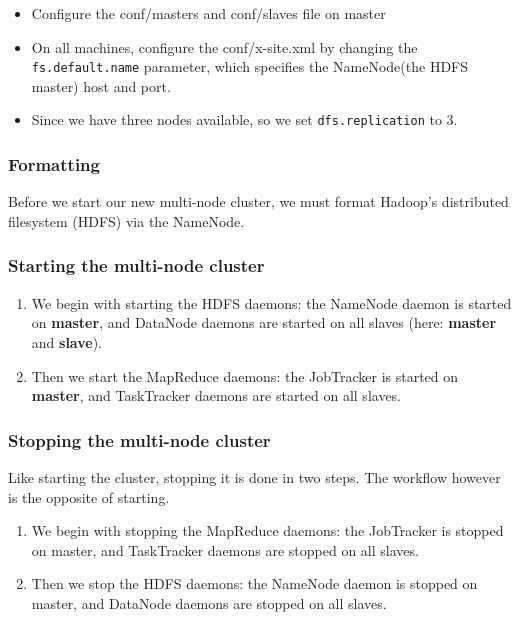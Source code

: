 \documentclass[a4paper]{article}
\begin{document}
\begin{itemize}
	\item Configure the conf/masters and conf/slaves file on master
	\item On all machines, configure the conf/x-site.xml by changing the \texttt{fs.default.name} parameter, which specifies the NameNode(the HDFS master) host and port.
	\item Since we have three nodes available, so we set \texttt{dfs.replication} to 3.
\end{itemize}

\subsubsection{Formatting}
Before we start our new multi-node cluster, we must format Hadoop’s distributed filesystem (HDFS) via the NameNode.

\subsubsection{Starting the multi-node cluster}
\begin{enumerate}
	\item We begin with starting the HDFS daemons: the NameNode daemon is started on \textbf{master}, and DataNode daemons are started on all slaves (here: \textbf{master} and \textbf{slave}).
	\item Then we start the MapReduce daemons: the JobTracker is started on \textbf{master}, and TaskTracker daemons are started on all slaves.
\end{enumerate}

\subsubsection{Stopping the multi-node cluster}
Like starting the cluster, stopping it is done in two steps. The workflow however is the opposite of starting.\\

\begin{enumerate}
	\item We begin with stopping the MapReduce daemons: the JobTracker is stopped on master, and TaskTracker daemons are stopped on all slaves.
	\item Then we stop the HDFS daemons: the NameNode daemon is stopped on master, and DataNode daemons are stopped on all slaves.
\end{enumerate}
\end{document}
